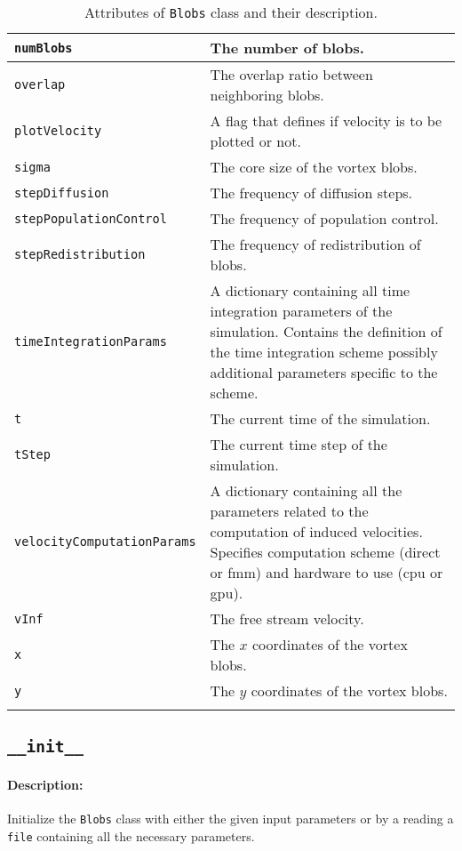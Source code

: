 \begin{longtable}{|l|p{12cm}|}
	\texttt{numBlobs} & The number of blobs.\\          \hline
	\texttt{overlap} & The overlap ratio between neighboring blobs.\\          \hline
	\texttt{plotVelocity} & A flag that defines if velocity is to be plotted or not.\\          \hline
	\texttt{sigma} & The core size of the vortex blobs.\\          \hline
	\texttt{stepDiffusion} & The frequency of diffusion steps.\\          \hline
	\texttt{stepPopulationControl} & The frequency of population control.\\          \hline
	\texttt{stepRedistribution} & The frequency of redistribution of blobs.\\          \hline
	\texttt{timeIntegrationParams} & A dictionary containing all time integration parameters of the simulation. Contains the definition of the time integration scheme possibly additional parameters specific to the scheme.\\ \hline
	\texttt{t} & The current time of the simulation.\\          \hline
	\texttt{tStep} & The current time step of the simulation.\\          \hline
	\texttt{velocityComputationParams} & A dictionary containing all the parameters related to the computation of induced velocities. Specifies computation scheme (direct or fmm) and hardware to use (cpu or gpu).\\          \hline
	\texttt{vInf} & The free stream velocity.\\          \hline
	\texttt{x} & The $x$ coordinates of the vortex blobs.\\          \hline
	\texttt{y} & The $y$ coordinates of the vortex blobs.\\          \hline	                                
    
                       
    \caption{Attributes of \texttt{Blobs} class and their description.}
    \label{tab:attributeBlobs}
\end{longtable}
\endgroup

\subsection*{\texttt{\_\_init\_\_}}
	\paragraph{Description:} Initialize the \texttt{Blobs} class with either the given input parameters or by a reading a \texttt{file} containing all the necessary parameters.\\
	

